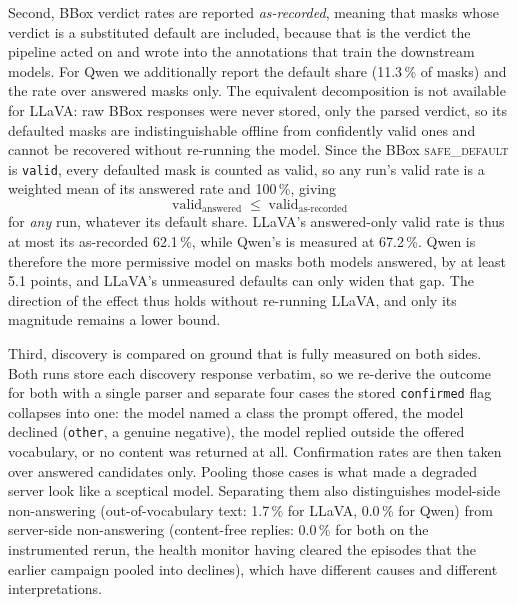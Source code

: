 \documentclass[conference]{IEEEtran}
\begin{document}
Second, BBox verdict rates are reported \emph{as-recorded}, meaning that masks whose verdict is a substituted default are included, because that is the verdict the pipeline acted on and wrote into the annotations that train the downstream models.
For Qwen we additionally report the default share (11.3\,\% of masks) and the rate over answered masks only.
The equivalent decomposition is not available for LLaVA: raw BBox responses were never stored, only the parsed verdict, so its defaulted masks are indistinguishable offline from confidently valid ones and cannot be recovered without re-running the model.
Since the BBox \textsc{safe\_default} is \texttt{valid}, every defaulted mask is counted as valid, so any run's valid rate is a weighted mean of its answered rate and 100\,\%, giving
\begin{equation}
\text{valid}_{\text{answered}} \;\leq\; \text{valid}_{\text{as-recorded}}
\label{eq:default_bound}
\end{equation}
for \emph{any} run, whatever its default share.
LLaVA's answered-only valid rate is thus at most its as-recorded 62.1\,\%, while Qwen's is measured at 67.2\,\%.
Qwen is therefore the more permissive model on masks both models answered, by at least 5.1 points, and LLaVA's unmeasured defaults can only widen that gap.
The direction of the effect thus holds without re-running LLaVA, and only its magnitude remains a lower bound.

Third, discovery is compared on ground that is fully measured on both sides.
Both runs store each discovery response verbatim, so we re-derive the outcome for both with a single parser and separate four cases the stored \texttt{confirmed} flag collapses into one: the model named a class the prompt offered, the model declined (\texttt{other}, a genuine negative), the model replied outside the offered vocabulary, or no content was returned at all.
Confirmation rates are then taken over answered candidates only.
Pooling those cases is what made a degraded server look like a sceptical model.
Separating them also distinguishes model-side non-answering (out-of-vocabulary text: 1.7\,\% for LLaVA, 0.0\,\% for Qwen) from server-side non-answering (content-free replies: 0.0\,\% for both on the instrumented rerun, the health monitor having cleared the episodes that the earlier campaign pooled into declines), which have different causes and different interpretations.
\end{document}
